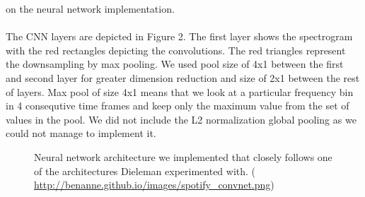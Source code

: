 \documentclass[11pt, a4paper]{article}
\begin{document}
    on the neural network implementation.
    \\ \\
    \noindent
    The CNN layers are depicted in Figure 2. The first layer shows the
    spectrogram with the red rectangles depicting the convolutions. The red
    triangles represent the downsampling by max pooling. We used pool size
    of 4x1 between the first and second layer for greater dimension reduction
    and size of 2x1 between the rest of layers. Max pool of size 4x1 means that
    we look at a particular frequency bin in 4 consequtive time frames and keep
    only the maximum value from the set of values in the pool. We did not
    include the L2 normalization global pooling as we could not manage to
    implement it.

    \begin{figure}
      \centering
      \caption{Neural network architecture we implemented that closely follows
        one of the architectures Dieleman experimented with.
        (\url{ http://benanne.github.io/images/spotify\_convnet.png})}
    \end{figure}
\end{document}
